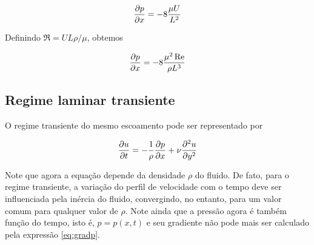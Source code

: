 \begin{equation}
  \frac{\partial p}{\partial x}=-8\frac{\mu U}{L^2}
\end{equation}

Definindo $\Re=UL\rho/\mu$, obtemos

\begin{equation}
  \frac{\partial p}{\partial x}=-8\frac{\mu^2\operatorname{Re}}{\rho L^3}
  \label{eq:gradp}
\end{equation}

\subsection{Regime laminar transiente}

O regime transiente do mesmo escoamento pode ser representado por

\begin{equation}
    \frac{\partial u}{\partial t}=-\frac{1}{\rho}\frac{\partial p}{\partial x}+\nu\frac{\partial^2u}{\partial y^2}
    \label{eq:perfil_laminar_transiente}
\end{equation}

Note que agora a equação depende da densidade $\rho$ do fluido. De fato, para o regime transiente, a variação do perfil de velocidade com o tempo deve ser influenciada pela inércia do fluido, convergindo, no entanto, para um valor comum para qualquer valor de $\rho$. Note ainda que a pressão agora é também função do tempo, isto é, $p = p(x,t)$ e seu gradiente não pode mais ser calculado pela expressão \ref{eq:gradp}.

